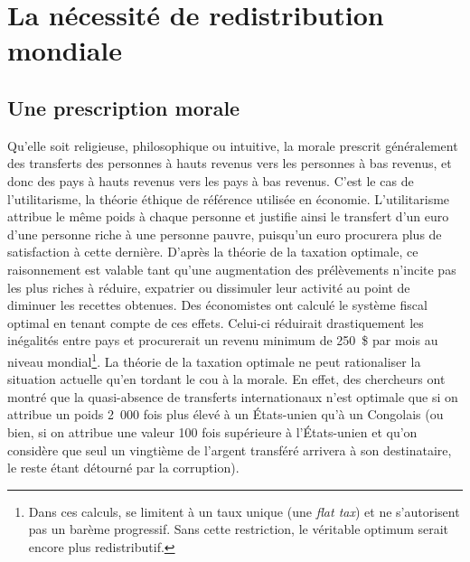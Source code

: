 \documentclass[a5paper,french,openany]{memoir}
\begin{document}
\chapter{La nécessité de redistribution mondiale\label{ch:redistribution_necessaire}}

\section{Une prescription morale}
Qu'elle soit religieuse, philosophique ou intuitive, la morale prescrit généralement des transferts des personnes à hauts revenus vers les personnes à bas revenus, et donc des pays à hauts revenus vers les pays à bas revenus. C'est le cas de l'utilitarisme, la théorie éthique de référence utilisée en économie. L'utilitarisme attribue le même poids à chaque personne et justifie ainsi le transfert d'un euro d'une personne riche à une personne pauvre, puisqu'un euro procurera plus de satisfaction à cette dernière. D'après la théorie de la taxation optimale, ce raisonnement est valable tant qu'une augmentation des prélèvements n'incite pas les plus riches à réduire, expatrier ou dissimuler leur activité au point de diminuer les recettes obtenues. Des économistes ont calculé le système fiscal optimal en tenant compte de ces effets. Celui-ci réduirait drastiquement les inégalités entre pays et procurerait un revenu minimum de 250~\$ par mois au niveau mondial\footnote{Dans ces calculs, \citet{kopczuk_limitations_2005} se limitent à un taux unique (une \textit{flat tax}) et ne s'autorisent pas un barème progressif. Sans cette restriction, le véritable optimum serait encore plus redistributif.}. La théorie de la taxation optimale ne peut rationaliser la situation actuelle qu'en tordant le cou à la morale. En effet, des chercheurs ont montré que la quasi-absence de transferts internationaux n'est optimale que si on attribue un poids 2~000 fois plus élevé à un États-unien qu'à un Congolais (ou bien, si on attribue une valeur 100 fois supérieure à l'États-unien et qu'on considère que seul un vingtième de l'argent transféré arrivera à son destinataire, le reste étant détourné par la corruption). %
\end{document}
